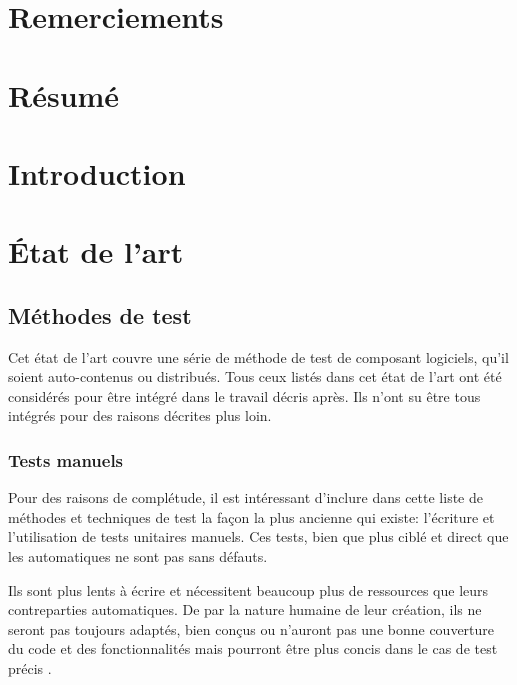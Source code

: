 \documentclass[a4paper]{report}
\begin{document}
\nocite{*}
\chapter*{Remerciements}



\chapter*{Résumé}


\tableofcontents

\chapter{Introduction}

\chapter{État de l'art}


\section{Méthodes de test}
Cet état de l'art couvre une série de méthode de test de composant logiciels, qu'il soient auto-contenus ou distribués.
Tous ceux listés dans cet état de l'art ont été considérés pour être intégré dans le travail décris après.
Ils n'ont su être tous intégrés pour des raisons décrites plus loin.


\subsection{Tests manuels}

Pour des raisons de complétude, il est intéressant d’inclure dans cette liste de méthodes et techniques de test la façon la plus ancienne qui existe: l’écriture et l’utilisation de tests unitaires manuels.
Ces tests, bien que plus ciblé et direct que les automatiques ne sont pas sans défauts.

Ils sont plus lents à écrire et nécessitent beaucoup plus de ressources que leurs contreparties automatiques.
De par la nature humaine de leur création, ils ne seront pas toujours adaptés, bien conçus ou n'auront pas une bonne couverture du code et des fonctionnalités mais pourront être plus concis dans le cas de test précis \cite{Zhu1997}.
\end{document}
